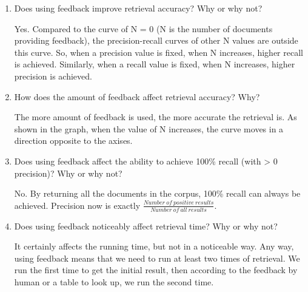 \documentclass[11pt]{article}
\begin{document}
\begin{enumerate}

\item Does using feedback improve retrieval accuracy? Why or why not?

Yes. Compared to the curve of N = 0 (N is the number of documents providing feedback), the precision-recall curves of other N values are outside this curve. So, when a precision value is fixed, when N increases, higher recall is achieved. Similarly, when a recall value is fixed, when N increases, higher precision is achieved.

\item How does the amount of feedback affect retrieval accuracy? Why?

The more amount of feedback is used, the more accurate the retrieval is. As shown in the graph, when the value of N increases, the curve moves in a direction opposite to the axises.

\item Does using feedback affect the ability to achieve 100\% recall (with > 0 precision)? Why or why not?

No. By returning all the documents in the corpus, 100\% recall can always be achieved. Precision now is exactly $\frac{Number\ of\ positive\ results}{Number\ of\ all\ results}$.

\item Does using feedback noticeably affect retrieval time? Why or why not?

It certainly affects the running time, but not in a noticeable way. Any way, using feedback means that we need to run at least two times of retrieval. We run the first time to get the initial result, then according to the feedback by human or a table to look up, we run the second time.

\end{enumerate}
\end{document}
